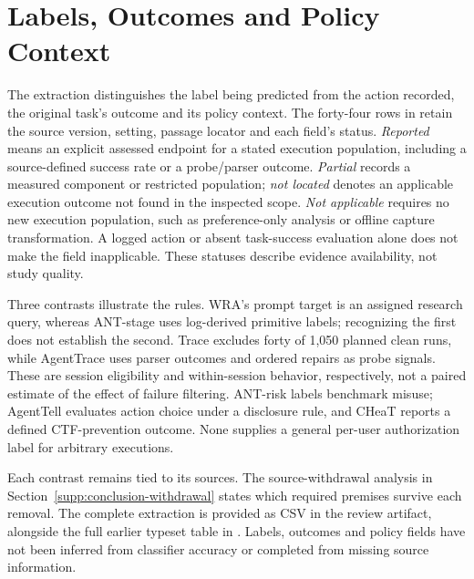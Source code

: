 \section{Labels, Outcomes and Policy Context}\label{sec:target-audit}
The extraction distinguishes the label being predicted from the action recorded, the original task's outcome and its policy context. The forty-four rows in  retain the source version, setting, passage locator and each field's status. \emph{Reported} means an explicit assessed endpoint for a stated execution population, including a source-defined success rate or a probe/parser outcome. \emph{Partial} records a measured component or restricted population; \emph{not located} denotes an applicable execution outcome not found in the inspected scope. \emph{Not applicable} requires no new execution population, such as preference-only analysis or offline capture transformation. A logged action or absent task-success evaluation alone does not make the field inapplicable. These statuses describe evidence availability, not study quality.

Three contrasts illustrate the rules. WRA's prompt target is an assigned research query, whereas ANT-stage uses log-derived primitive labels; recognizing the first does not establish the second. Trace excludes forty of 1,050 planned clean runs, while AgentTrace uses parser outcomes and ordered repairs as probe signals. These are session eligibility and within-session behavior, respectively, not a paired estimate of the effect of failure filtering. ANT-risk labels benchmark misuse; AgentTell evaluates action choice under a disclosure rule, and CHeaT reports a defined CTF-prevention outcome. None supplies a general per-user authorization label for arbitrary executions.

Each contrast remains tied to its sources. The source-withdrawal analysis in Section~\ref{supp:conclusion-withdrawal} states which required premises survive each removal. The complete extraction is provided as CSV in the review artifact, alongside the full earlier typeset table in . Labels, outcomes and policy fields have not been inferred from classifier accuracy or completed from missing source information.

